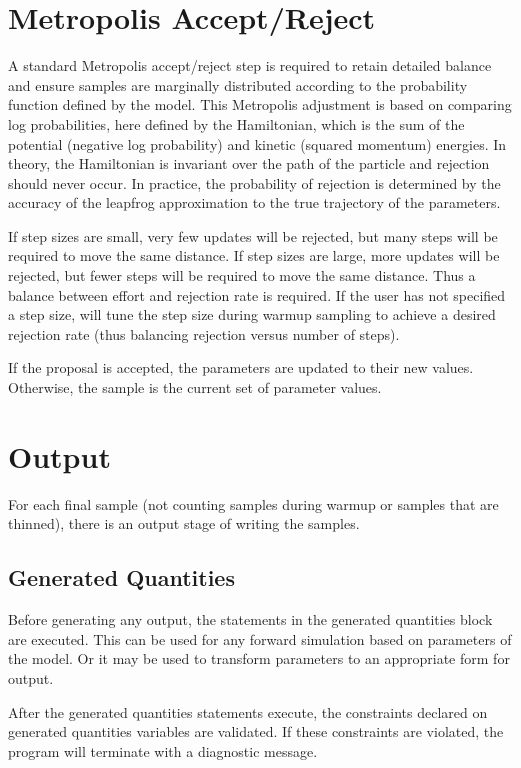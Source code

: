 \section{Metropolis Accept/Reject}

A standard Metropolis accept/reject step is required to retain detailed
balance and ensure samples are marginally distributed according to the
probability function defined by the model.  This Metropolis adjustment
is based on comparing log probabilities, here defined by the
Hamiltonian, which is the sum of the potential (negative log
probability) and kinetic (squared momentum) energies.  In theory, the
Hamiltonian is invariant over the path of the particle and rejection
should never occur.  In practice, the probability of rejection is
determined by the accuracy of the leapfrog approximation to the true
trajectory of the parameters.

If step sizes are small, very few updates will be rejected, but many
steps will be required to move the same distance.  If step sizes are
large, more updates will be rejected, but fewer steps will be required
to move the same distance.  Thus a balance between effort and
rejection rate is required.  If the user has not specified a step
size, \Stan will tune the step size during warmup sampling to achieve
a desired rejection rate (thus balancing rejection versus number of
steps).

If the proposal is accepted, the parameters are updated to their new
values.  Otherwise, the sample is the current set of parameter values.


\section{Output}

For each final sample (not counting samples during warmup or samples
that are thinned), there is an output stage of writing the samples.

\subsection{Generated Quantities} 

Before generating any output, the statements in the generated quantities 
block are executed.  This can be used for any forward simulation based
on parameters of the model.  Or it may be used to transform parameters
to an appropriate form for output.  

After the generated quantities statements execute, the constraints
declared on generated quantities variables are validated.   If these
constraints are violated, the program will terminate with a diagnostic message.

